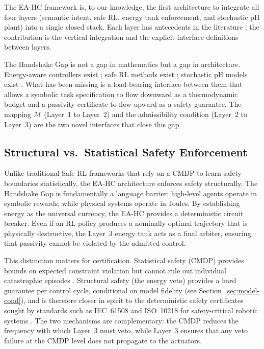 \documentclass[11pt]{article}
\begin{document}
The EA-HC framework is, to our knowledge, the first architecture to integrate all four layers
(semantic intent, safe RL, energy tank enforcement, and stochastic pH plant) into a single
closed stack. Each layer has antecedents in the literature \cite{ferraguti2013,altman1999,cordoni2022,borghesan2016};
the contribution is the vertical integration and the explicit interface definitions between layers.

The Handshake Gap is not a gap in mathematics but a gap in architecture. Energy-aware
controllers exist \cite{ferraguti2015,schindlbeck2015}; safe RL methods exist
\cite{garcia2015,achiam2017}; stochastic pH models exist \cite{cordoni2022,fang2017}. What
has been missing is a load-bearing interface between them that allows a symbolic task
specification to flow downward as a thermodynamic budget and a passivity certificate to flow
upward as a safety guarantee. The mapping $\mathcal{M}$ (Layer~1 to Layer~2) and the
admissibility condition (Layer~2 to Layer~3) are the two novel interfaces that close this gap.

\subsection{Structural vs.\ Statistical Safety Enforcement}

Unlike traditional Safe RL frameworks that rely on a CMDP to learn safety boundaries
statistically, the EA-HC architecture enforces safety structurally. The Handshake Gap is
fundamentally a language barrier: high-level agents operate in symbolic rewards, while physical
systems operate in Joules. By establishing energy as the universal currency, the EA-HC
provides a deterministic circuit breaker. Even if an RL policy produces a nominally optimal
trajectory that is physically destructive, the Layer~3 energy tank acts as a final arbiter,
ensuring that passivity cannot be violated by the admitted control.

This distinction matters for certification. Statistical safety (CMDP) provides bounds on
expected constraint violation but cannot rule out individual catastrophic episodes
\cite{garcia2015}. Structural safety (the energy veto) provides a hard guarantee per control
cycle, conditional on model fidelity (see Section~\ref{sec:model-cond}), and is therefore
closer in spirit to the deterministic safety certificates sought by standards such as IEC~61508
and ISO~10218 for safety-critical robotic systems \cite{seshia2018}. The two mechanisms are
complementary: the CMDP reduces the frequency with which Layer~3 must veto, while Layer~3
ensures that any veto failure at the CMDP level does not propagate to the actuators.
\end{document}
